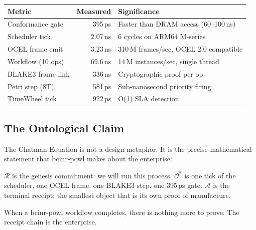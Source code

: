 \documentclass[12pt,a4paper]{article}
\theoremstyle{definition}
\theoremstyle{remark}
\newcommand{\Ostar}{\mathcal{O}^{*}}
\newcommand{\Agency}{\mathcal{A}}
\newcommand{\Reality}{\mathcal{R}}
\begin{document}
\begin{center}
\renewcommand{\arraystretch}{1.1}
\begin{tabular}{lrl}
\toprule
\textbf{Metric} & \textbf{Measured} & \textbf{Significance} \\
\midrule
Conformance gate & 395\,ps & Faster than DRAM access (60--100\,ns) \\
Scheduler tick & 2.07\,ns & 6 cycles on ARM64 M-series \\
OCEL frame emit & 3.23\,ns & 310\,M frames/sec, OCEL 2.0 compatible \\
Workflow (10 ops) & 69.6\,ns & 14\,M instances/sec, single thread \\
BLAKE3 frame link & 336\,ns & Cryptographic proof per op \\
Petri step (8T) & 581\,ps & Sub-nanosecond priority firing \\
TimeWheel tick & 922\,ps & O(1) SLA detection \\
\bottomrule
\end{tabular}
\end{center}

\subsection{The Ontological Claim}

The Chatman Equation is not a design metaphor.
It is the precise mathematical statement that bcinr-powl makes about the enterprise:

\begin{center}
\end{center}

$\Reality$ is the genesis commitment: we will run this process.
$\Ostar$ is one tick of the scheduler, one OCEL frame, one BLAKE3 step, one 395\,ps gate.
$\Agency$ is the terminal receipt: the smallest object that is its own proof of manufacture.

When a bcinr-powl workflow completes, there is nothing more to prove.
The receipt chain is the enterprise.
\end{document}
